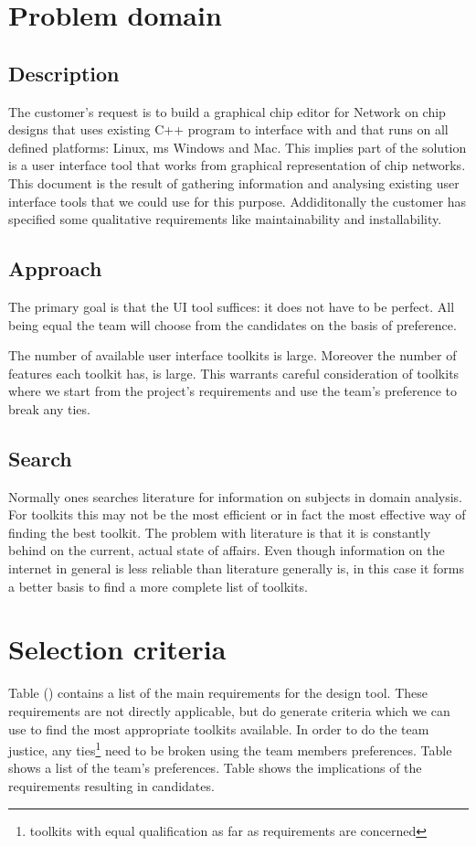 \section{Problem domain}
\subsection{Description}

The customer's request is to build a graphical chip editor for Network on chip
designs that uses existing C++ program to interface with and that runs on all
defined platforms: Linux, ms Windows and Mac. This implies part of the solution
is a user interface tool that works from graphical representation of chip
networks. This document is the result of gathering information and analysing
existing user interface tools that we could use for this purpose. Addiditonally
the customer has specified some qualitative requirements like maintainability
and installability.

\subsection{Approach}

The primary goal is that the UI tool suffices: it does not have to be perfect.
All being equal the team will choose from the candidates on the basis of
preference.

The number of available user interface toolkits is large.  Moreover the number
of features each toolkit has, is large. This warrants careful consideration
of toolkits where we start from the project's requirements and use the team's
preference to break any ties.

\subsection{Search}

Normally ones searches literature for information on subjects in domain
analysis.  For toolkits this may not be the most efficient or in fact the most
effective way of finding the best toolkit. The problem with literature is that
it is constantly behind on the current, actual state of affairs. Even though
information on the internet in general is less reliable than literature
generally is, in this case it forms a better basis to find a more complete list
of toolkits.

\section{Selection criteria}

Table () contains a list of the main requirements for the design
tool. These requirements are not directly applicable, but do generate criteria
which we can use to find the most appropriate toolkits available. In order to do
the team justice, any ties\footnote{toolkits with equal qualification as far as
requirements are concerned} need to be broken using the team members
preferences. Table  shows a list of the team's preferences.
Table  shows the implications of the requirements resulting in
 candidates.


